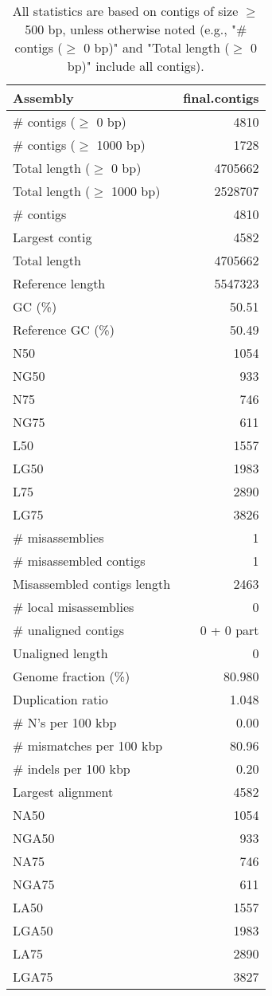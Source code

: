 \documentclass[12pt,a4paper]{article}
\begin{document}
\begin{table}[ht]
\begin{center}
\caption{All statistics are based on contigs of size $\geq$ 500 bp, unless otherwise noted (e.g., "\# contigs ($\geq$ 0 bp)" and "Total length ($\geq$ 0 bp)" include all contigs).}
\begin{tabular}{|l*{1}{|r}|}
\hline
Assembly & final.contigs \\ \hline
\# contigs ($\geq$ 0 bp) & 4810 \\ \hline
\# contigs ($\geq$ 1000 bp) & 1728 \\ \hline
Total length ($\geq$ 0 bp) & 4705662 \\ \hline
Total length ($\geq$ 1000 bp) & 2528707 \\ \hline
\# contigs & 4810 \\ \hline
Largest contig & 4582 \\ \hline
Total length & 4705662 \\ \hline
Reference length & 5547323 \\ \hline
GC (\%) & 50.51 \\ \hline
Reference GC (\%) & 50.49 \\ \hline
N50 & 1054 \\ \hline
NG50 & 933 \\ \hline
N75 & 746 \\ \hline
NG75 & 611 \\ \hline
L50 & 1557 \\ \hline
LG50 & 1983 \\ \hline
L75 & 2890 \\ \hline
LG75 & 3826 \\ \hline
\# misassemblies & 1 \\ \hline
\# misassembled contigs & 1 \\ \hline
Misassembled contigs length & 2463 \\ \hline
\# local misassemblies & 0 \\ \hline
\# unaligned contigs & 0 + 0 part \\ \hline
Unaligned length & 0 \\ \hline
Genome fraction (\%) & 80.980 \\ \hline
Duplication ratio & 1.048 \\ \hline
\# N's per 100 kbp & 0.00 \\ \hline
\# mismatches per 100 kbp & 80.96 \\ \hline
\# indels per 100 kbp & 0.20 \\ \hline
Largest alignment & 4582 \\ \hline
NA50 & 1054 \\ \hline
NGA50 & 933 \\ \hline
NA75 & 746 \\ \hline
NGA75 & 611 \\ \hline
LA50 & 1557 \\ \hline
LGA50 & 1983 \\ \hline
LA75 & 2890 \\ \hline
LGA75 & 3827 \\ \hline
\end{tabular}
\end{center}
\end{table}
\end{document}
